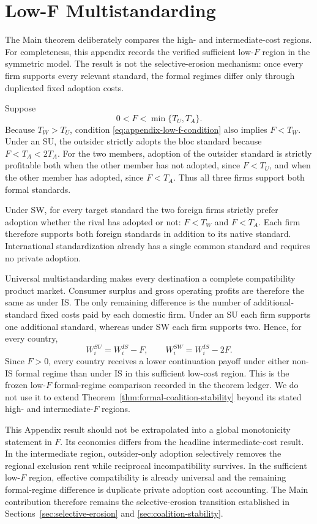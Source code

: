\section{Low-F Multistandarding}
\label{app:low-f}

The Main theorem deliberately compares the high- and intermediate-cost regions. For completeness, this appendix records the verified sufficient low-$F$ region in the symmetric model. The result is not the selective-erosion mechanism: once every firm supports every relevant standard, the formal regimes differ only through duplicated fixed adoption costs.

Suppose
\begin{equation}
0<F<\min\{T_U,T_A\}.
\label{eq:appendix-low-f-condition}
\end{equation}
Because $T_W>T_U$, condition \eqref{eq:appendix-low-f-condition} also implies $F<T_W$. Under an SU, the outsider strictly adopts the bloc standard because $F<T_A<2T_A$. For the two members, adoption of the outsider standard is strictly profitable both when the other member has not adopted, since $F<T_U$, and when the other member has adopted, since $F<T_A$. Thus all three firms support both formal standards.

Under SW, for every target standard the two foreign firms strictly prefer adoption whether the rival has adopted or not: $F<T_W$ and $F<T_A$. Each firm therefore supports both foreign standards in addition to its native standard. International standardization already has a single common standard and requires no private adoption.

Universal multistandarding makes every destination a complete compatibility product market. Consumer surplus and gross operating profits are therefore the same as under IS. The only remaining difference is the number of additional-standard fixed costs paid by each domestic firm. Under an SU each firm supports one additional standard, whereas under SW each firm supports two. Hence, for every country,
\begin{equation}
\boxed{
W_i^{SU}=W_i^{IS}-F,
\qquad
W_i^{SW}=W_i^{IS}-2F.
}
\label{eq:appendix-low-f-welfare}
\end{equation}
Since $F>0$, every country receives a lower continuation payoff under either non-IS formal regime than under IS in this sufficient low-cost region. This is the frozen low-$F$ formal-regime comparison recorded in the theorem ledger. We do not use it to extend Theorem~\ref{thm:formal-coalition-stability} beyond its stated high- and intermediate-$F$ regions.

This Appendix result should not be extrapolated into a global monotonicity statement in $F$. Its economics differs from the headline intermediate-cost result. In the intermediate region, outsider-only adoption selectively removes the regional exclusion rent while reciprocal incompatibility survives. In the sufficient low-$F$ region, effective compatibility is already universal and the remaining formal-regime difference is duplicate private adoption cost accounting. The Main contribution therefore remains the selective-erosion transition established in Sections~\ref{sec:selective-erosion} and \ref{sec:coalition-stability}.
